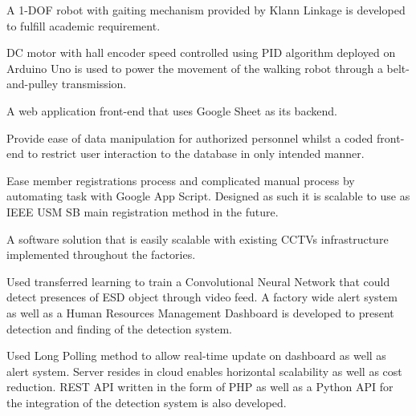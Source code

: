 \documentclass[letterpaper]{deedy-resume} %
\begin{document}

\newpage %

\begin{minipage}[t]{0.33\textwidth} %
\end{minipage}
\hfill
\begin{minipage}[t]{0.66\textwidth} %

\vspace{\topsep}
\begin{tightitemize}
\item A 1-DOF robot with gaiting mechanism provided by Klann Linkage is developed to fulfill academic requirement.
\item DC motor with hall encoder speed controlled using PID algorithm deployed on Arduino Uno is used to power the movement of the walking robot through a belt-and-pulley transmission.
\end{tightitemize} 
\sectionspace %

\vspace{\topsep}
\begin{tightitemize}
\item A web application front-end that uses Google Sheet as its backend.
\item Provide ease of data manipulation for authorized personnel whilst a coded front-end to restrict user interaction to the database in only intended manner.
\item Ease member registrations process and complicated manual process by automating task with Google App Script. 
Designed as such it is scalable to use as IEEE USM SB main registration method in the future.
\end{tightitemize} 
\sectionspace %

\vspace{\topsep}
\begin{tightitemize}
\item A software solution that is easily scalable with existing CCTVs infrastructure implemented throughout the factories.
\item Used transferred learning to train a Convolutional Neural Network that could detect presences of ESD object through video feed. 
A factory wide alert system as well as a Human Resources Management Dashboard is developed to present detection and finding of the detection system.
\item Used Long Polling method to allow real-time update on dashboard as well as alert system. 
Server resides in cloud enables horizontal scalability as well as cost reduction. 
REST API written in the form of PHP as well as a Python API for the integration of the detection system is also developed.
\end{tightitemize} 
\sectionspace %


\end{minipage}
\end{document}
